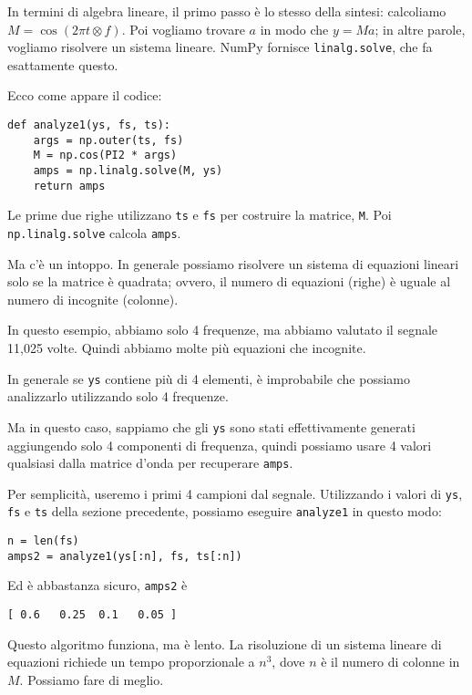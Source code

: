 \documentclass[12pt]{book} \usepackage[width=5.5in,height=8.5in, hmarginratio=3:2,vmarginratio=1:1]{geometry}
\begin{document}
In termini di algebra lineare, il primo passo è lo stesso della sintesi: calcoliamo $M = \cos (2 \pi t \otimes f)$. Poi vogliamo trovare $a$ in modo che $y = M a$; in altre parole, vogliamo risolvere un sistema lineare. NumPy fornisce {\tt linalg.solve}, che fa esattamente questo.

Ecco come appare il codice:

\begin{verbatim} 
def analyze1(ys, fs, ts):
    args = np.outer(ts, fs)
    M = np.cos(PI2 * args)
    amps = np.linalg.solve(M, ys)
    return amps
 \end{verbatim} 

Le prime due righe utilizzano {\tt ts} e {\tt fs} per costruire la matrice, {\tt M}. Poi {\tt np.linalg.solve} calcola {\tt amps}.

Ma c'è un intoppo. In generale possiamo risolvere un sistema di equazioni lineari solo se la matrice è quadrata; ovvero, il numero di equazioni (righe) è uguale al numero di incognite (colonne).

In questo esempio, abbiamo solo 4 frequenze, ma abbiamo valutato il segnale 11,025 volte. Quindi abbiamo molte più equazioni che incognite.

In generale se {\tt ys} contiene più di 4 elementi, è improbabile che possiamo analizzarlo utilizzando solo 4 frequenze.

Ma in questo caso, sappiamo che gli {\tt ys} sono stati effettivamente generati aggiungendo solo 4 componenti di frequenza, quindi possiamo usare 4 valori qualsiasi dalla matrice d'onda per recuperare {\tt amps}.

Per semplicità, useremo i primi 4 campioni dal segnale. Utilizzando i valori di {\tt ys}, {\tt fs} e {\tt ts} della sezione precedente, possiamo eseguire {\tt analyze1} in questo modo:

\begin{verbatim} 
n = len(fs)
amps2 = analyze1(ys[:n], fs, ts[:n])
 \end{verbatim} 

Ed è abbastanza sicuro, {\tt amps2} è

\begin{verbatim} 
[ 0.6   0.25  0.1   0.05 ]
 \end{verbatim} 

Questo algoritmo funziona, ma è lento. La risoluzione di un sistema lineare di equazioni richiede un tempo proporzionale a $n^3$, dove $n$ è il numero di colonne in $M$. Possiamo fare di meglio.
\end{document}
